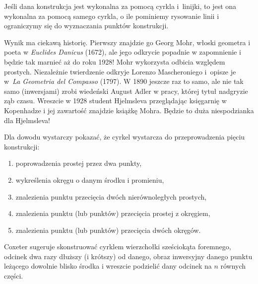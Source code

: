%

\begin{theorem}
%
    Jeśli dana konstrukcja jest wykonalna za pomocą cyrkla i~linijki, to jest ona wykonalna za pomocą samego cyrkla, o ile pominiemy rysowanie linii i ograniczymy się do wyznaczania punktów konstrukcji.
\end{theorem}

Wynik ma ciekawą historię.
Pierwszy znajdzie go Georg Mohr, włoski geometra i poeta w \emph{Euclides Danicus} (1672), ale jego odkrycie popadnie w zapomnienie i będzie tak marnieć aż do roku 1928!
Mohr wykorzysta odbicia względem prostych. %
Niezależnie twierdzenie odkryje Lorenzo Mascheroniego i~opisze je w~\emph{La Geometria del Compasso} (1797).
W 1890 jeszcze raz to samo, ale nie tak samo (inwersjami) zrobi wiedeński August Adler w pracy, której tytuł nadgryzie ząb czasu.
Wreszcie w 1928 student Hjelmsleva przeglądając księgarnię w Kopenhadze i jej zawartość znajdzie książkę Mohra.
Będzie to duża niespodzianka dla Hjelmsleva!

Dla dowodu wystarczy pokazać, że cyrkel wystarcza do przeprowadzenia pięciu konstrukcji:
\begin{enumerate}
    \item poprowadzenia prostej przez dwa punkty,
    \item wykreślenia okręgu o danym środku i promieniu,
    \item znalezienia punktu przecięcia dwóch nierównoległych prostych,
    \item znalezienia punktu (lub punktów) przecięcia prostej z okręgiem,
    \item znalezienia punktu (lub punktów) przecięcia dwóch okręgów.
\end{enumerate}

Coxeter \cite[s. 95]{coxeter_1967} sugeruje skonstruować cyrklem wierzchołki sześciokąta foremnego, odcinek dwa razy dłuższy (i krótszy) od danego, obraz inwersyjny danego punktu leżącego dowolnie blisko środka i wreszcie podzielić dany odcinek na $n$ równych części.

%